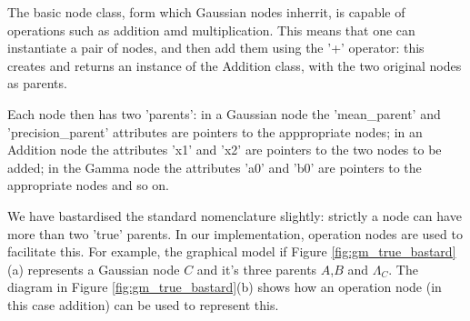\documentclass{article}
\newcommand{\<}{\langle}
\renewcommand{\>}{\rangle}
\begin{document}
The basic node class, form which Gaussian nodes inherrit, is capable of operations such as addition amd multiplication. This means that one can instantiate a pair of nodes, and then add them using the '+' operator: this creates and returns an instance of the Addition class, with the two original nodes as parents. 

Each node then has two 'parents': in a Gaussian node the 'mean\_parent' and 'precision\_parent' attributes are pointers to the apppropriate nodes; in an Addition node the attributes 'x1' and 'x2' are pointers to the two nodes to be added; in the Gamma node the attributes 'a0' and 'b0' are pointers to the appropriate nodes and so on.

We have bastardised the standard nomenclature slightly: strictly a node can have more than two 'true' parents. In our implementation, operation nodes are used to facilitate this. For example, the graphical model if Figure \ref{fig:gm_true_bastard}(a) represents a Gaussian node $C$ and it's three parents $A$,$B$ and $\Lambda_C$.  The diagram in Figure \ref{fig:gm_true_bastard}(b) shows how an operation node (in this case addition) can be used to represent this. 
\end{document}
